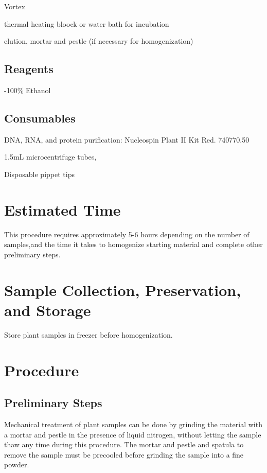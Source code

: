 \documentclass[12pt]{../SOP3_alpha}\usepackage[]{graphicx}\usepackage[]{color}
\begin{document}
\NP Vortex

\NP thermal heating bloock or water bath for incubation

\NP elution, mortar and pestle (if necessary for homogenization)

\subsection*{Reagents}

-100\% Ethanol 

\subsection*{Consumables}

\NP DNA, RNA, and protein purification: Nucleospin Plant II Kit Red. 740770.50

\NP 1.5mL microcentrifuge tubes, 

\NP Disposable pippet tips


\section{Estimated Time}

\NP This procedure requires approximately 5-6 hours depending on the number of samples,and the time it takes to homogenize starting material and complete other preliminary steps. 

\section{Sample Collection, Preservation, and Storage}

\NP Store plant samples in freezer before homogenization.

\section{Procedure}

\subsection*{Preliminary Steps}
	 
\NP Mechanical treatment of plant samples can be done by grinding the material with a mortar and pestle in the presence of liquid nitrogen, without letting the sample thaw any time during this procedure. The mortar and pestle and spatula to remove the sample must be precooled before grinding the sample into a fine powder.
\end{document}
